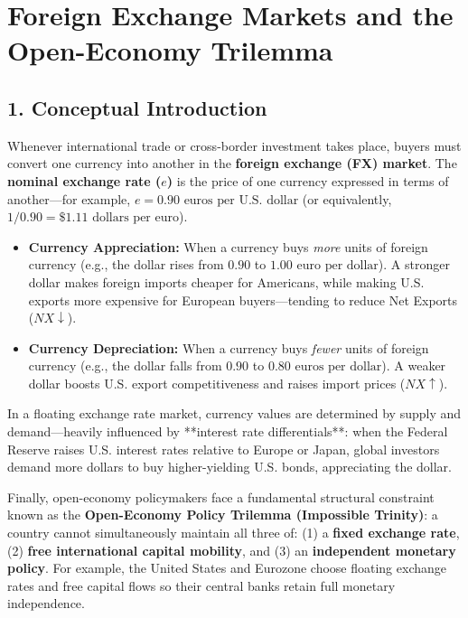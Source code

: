 \documentclass[11pt,letterpaper]{article}
\begin{document}
\section{Foreign Exchange Markets and the Open-Economy Trilemma}

\subsection*{1. Conceptual Introduction}
Whenever international trade or cross-border investment takes place, buyers must convert one currency into another in the \textbf{foreign exchange (FX) market}. The \textbf{nominal exchange rate ($e$)} is the price of one currency expressed in terms of another—for example, $e = 0.90\text{ euros per U.S. dollar}$ (or equivalently, $1 / 0.90 = \$1.11\text{ dollars per euro}$).
\begin{itemize}
    \item \textbf{Currency Appreciation:} When a currency buys \emph{more} units of foreign currency (e.g., the dollar rises from $0.90$ to $1.00\text{ euro per dollar}$). A stronger dollar makes foreign imports cheaper for Americans, while making U.S. exports more expensive for European buyers—tending to reduce Net Exports ($NX \downarrow$).
    \item \textbf{Currency Depreciation:} When a currency buys \emph{fewer} units of foreign currency (e.g., the dollar falls from $0.90$ to $0.80\text{ euros per dollar}$). A weaker dollar boosts U.S. export competitiveness and raises import prices ($NX \uparrow$).
\end{itemize}

In a floating exchange rate market, currency values are determined by supply and demand—heavily influenced by **interest rate differentials**: when the Federal Reserve raises U.S. interest rates relative to Europe or Japan, global investors demand more dollars to buy higher-yielding U.S. bonds, appreciating the dollar.

Finally, open-economy policymakers face a fundamental structural constraint known as the \textbf{Open-Economy Policy Trilemma (Impossible Trinity)}: a country cannot simultaneously maintain all three of: (1) a \textbf{fixed exchange rate}, (2) \textbf{free international capital mobility}, and (3) an \textbf{independent monetary policy}. For example, the United States and Eurozone choose floating exchange rates and free capital flows so their central banks retain full monetary independence.
\end{document}
